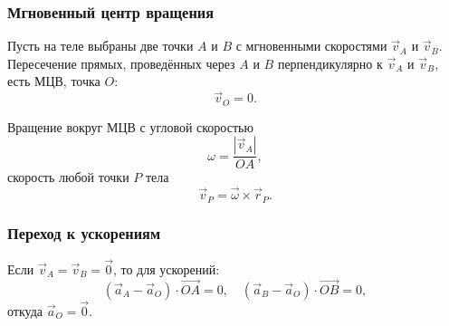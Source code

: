 \documentclass[12pt, a4paper]{article}
\begin{document}
\subsubsection*{Мгновенный центр вращения}

Пусть на теле выбраны две точки $A$ и $B$ с мгновенными скоростями $\vec v_A$ и $\vec v_B$. Пересечение прямых, проведённых через $A$ и $B$ перпендикулярно к $\vec v_A$ и $\vec v_B$, есть МЦВ, точка $O$:
\[
\vec v_O = 0.
\]

Вращение вокруг МЦВ с угловой скоростью
\[
\omega = \frac{|\vec v_A|}{OA},
\]
скорость любой точки $P$ тела
\[
\vec v_P = \vec \omega \times \vec r_P.
\]

\subsubsection*{Переход к ускорениям}

Если $\vec v_A = \vec v_B = \vec 0$, то для ускорений:
\[
(\vec a_A - \vec a_O)\cdot \overrightarrow{OA} = 0, \quad (\vec a_B - \vec a_O)\cdot \overrightarrow{OB} = 0,
\]
откуда $\vec a_O = \vec 0$.
\end{document}
